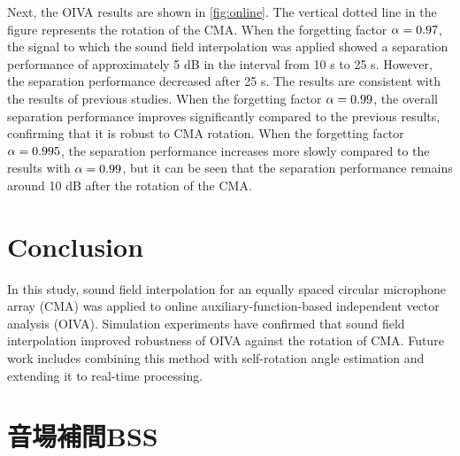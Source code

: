 \documentclass[twocolumn,9pt,dvipdfmx]{article}
\begin{document}
Next, the OIVA results are shown in \cref{fig:online}.
The vertical dotted line in the figure represents the rotation of the CMA.
When the forgetting factor $\alpha = 0.97$, the signal to which the sound field interpolation was applied showed a separation performance of approximately 5 dB in the interval from 10 s to 25 s.
However, the separation performance decreased after 25 s. The results are consistent with the results of previous studies.
When the forgetting factor $\alpha = 0.99 $, the overall separation performance improves significantly compared to the previous results, confirming that it is robust to CMA rotation.
When the forgetting factor $\alpha = 0.995$, the separation performance increases more slowly compared to the results with $\alpha = 0.99$, but it can be seen that the separation performance remains around 10 dB after the rotation of the CMA.

\section{Conclusion}
In this study, sound field interpolation for an equally spaced circular microphone array (CMA) was applied to online auxiliary-function-based independent vector analysis (OIVA).
Simulation experiments have confirmed that sound field interpolation improved robustness of OIVA against the rotation of CMA.
Future work includes combining this method with self-rotation angle estimation \cite{Lian:2021:APSIPA} and extending it to real-time processing.

\clearpage\newpage



\clearpage\newpage
\section*{音場補間BSS}
\end{document}
